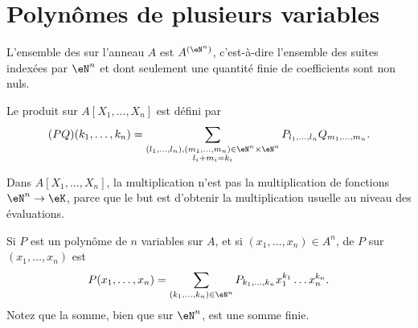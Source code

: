 \section{Polynômes de plusieurs variables}

\begin{definition}      \label{DEFooZNHOooCruuwI}
	L'ensemble des  sur l'anneau \( A\) est \( A^{(\eN^n)}\), c'est-à-dire l'ensemble des suites indexées par \( \eN^n\) et dont seulement une quantité finie de coefficients sont non nuls.

	Le produit sur \( A[X_1,\ldots, X_n]\) est défini par
	\begin{equation}
		(PQ)(k_1,\ldots, k_n)=\sum_{\substack{ (l_1,\ldots, l_n),(m_1,\ldots, m_n)\in \eN^n\times \eN^n   \\l_i+m_i=k_i}}P_{l_1,\ldots, l_n}Q_{m_1,\ldots, m_n}.
	\end{equation}
\end{definition}

\begin{normaltext}
	Dans \( A[X_1,\ldots, X_n]\), la multiplication n'est pas la multiplication de fonctions \( \eN^n\to \eK\), parce que le but est d'obtenir la multiplication usuelle au niveau des évaluations.
\end{normaltext}

\begin{definition}
	Si \( P\) est un polynôme de \( n\) variables sur \( A\), et si \( (x_1,\ldots, x_n)\in A^n\),  de \( P\) sur \( (x_1,\ldots, x_n)\) est
	\begin{equation}
		P(x_1,\ldots, x_n)=\sum_{(k_1,\ldots, k_n)\in \eN^n}P_{k_1,\ldots, k_n}x_1^{k_1}\ldots x_n^{k_n}.
	\end{equation}
	Notez que la somme, bien que sur \( \eN^n\), est une somme finie.
\end{definition}


